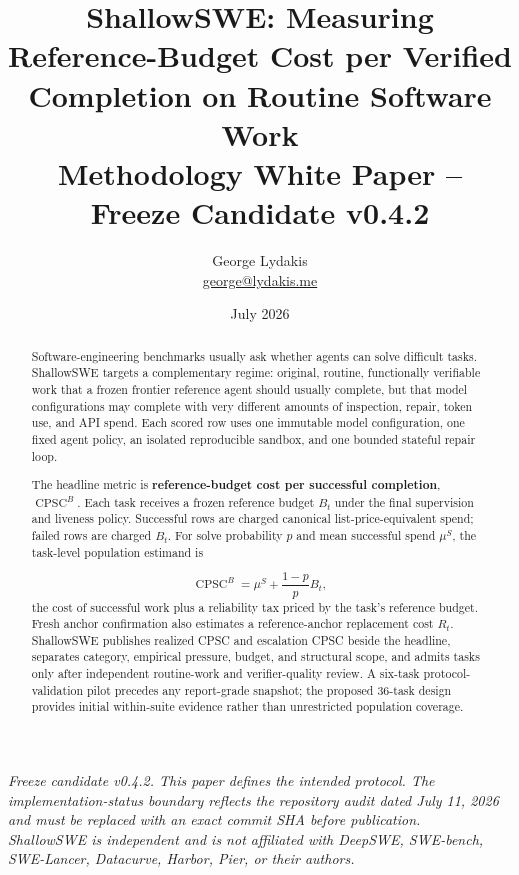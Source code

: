 \documentclass[11pt]{article}
\title{\textbf{ShallowSWE: Measuring Reference-Budget Cost per Verified Completion on Routine Software Work}\\[0.5em]
  \large Methodology White Paper -- Freeze Candidate v0.4.2}
\author{George Lydakis\\\href{mailto:george@lydakis.me}{george@lydakis.me}}
\date{July 2026}
\begin{document}
  \maketitle

  \begin{center}
  \small\itshape
Freeze candidate v0.4.2. This paper defines the intended protocol. The
  implementation-status boundary reflects the repository audit dated July 11,
  2026 and must be replaced with an exact commit SHA before publication.\\[0.4em]
  ShallowSWE is independent and is not affiliated with DeepSWE, SWE-bench,
  SWE-Lancer, Datacurve, Harbor, Pier, or their authors.
  \end{center}
  \vspace{0.5em}

  \begin{abstract}
Software-engineering benchmarks usually ask whether agents can solve difficult tasks. ShallowSWE targets a complementary regime: original, routine, functionally verifiable work that a frozen frontier reference agent should usually complete, but that model configurations may complete with very different amounts of inspection, repair, token use, and API spend. Each scored row uses one immutable model configuration, one fixed agent policy, an isolated reproducible sandbox, and one bounded stateful repair loop.

The headline metric is \textbf{reference-budget cost per successful completion}, $\operatorname{CPSC}^{B}$. Each task receives a frozen reference budget $B_t$ under the final supervision and liveness policy. Successful rows are charged canonical list-price-equivalent spend; failed rows are charged $B_t$. For solve probability $p$ and mean successful spend $\mu^S$, the task-level population estimand is

\[
\operatorname{CPSC}^{B}=\mu^S+\frac{1-p}{p}B_t,
\]
the cost of successful work plus a reliability tax priced by the task's reference budget. Fresh anchor confirmation also estimates a reference-anchor replacement cost $R_t$. ShallowSWE publishes realized CPSC and escalation CPSC beside the headline, separates category, empirical pressure, budget, and structural scope, and admits tasks only after independent routine-work and verifier-quality review. A six-task protocol-validation pilot precedes any report-grade snapshot; the proposed 36-task design provides initial within-suite evidence rather than unrestricted population coverage.
\end{abstract}
\end{document}
